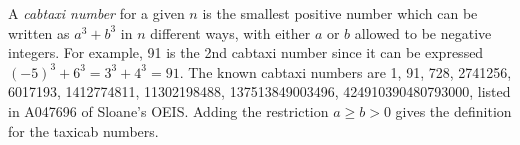 \documentclass[12pt]{article}
\begin{document}
A {\em cabtaxi number} for a given $n$ is the smallest positive number which can be written as $a^3 + b^3$ in $n$ different ways, with either $a$ or $b$ allowed to be negative integers. For example, 91 is the 2nd cabtaxi number since it can be expressed $(-5)^3 + 6^3 = 3^3 + 4^3 = 91$. The known cabtaxi numbers are 1, 91, 728, 2741256, 6017193, 1412774811, 11302198488, 137513849003496, 424910390480793000, listed in A047696 of Sloane's OEIS. Adding the restriction $a \geq b > 0$ gives the definition for the taxicab numbers.
\end{document}
